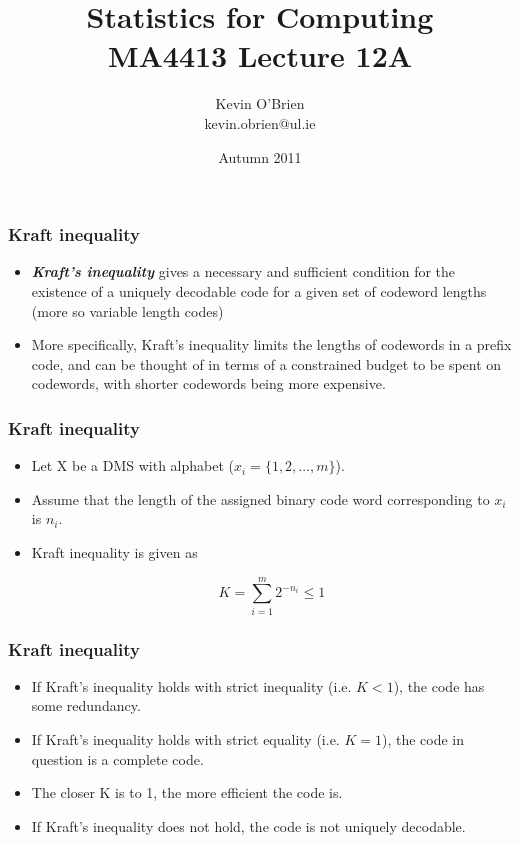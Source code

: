 \documentclass[a4]{beamer}
\title[MA4413]{Statistics for Computing \\ {\normalsize MA4413 Lecture 12A}}
\author[Kevin O'Brien]{Kevin O'Brien \\ {\scriptsize kevin.obrien@ul.ie}}
\date{Autumn 2011}
\institute[Maths \& Stats]{Dept. of Mathematics \& Statistics, \\ University \textit{of} Limerick}
\begin{document}
	
\begin{frame}
\frametitle{Kraft inequality}
\begin{itemize}
\item \textbf{\emph{Kraft's inequality}} gives a necessary and sufficient condition for the existence of a uniquely decodable code for a given set of codeword lengths (more so variable length codes)

\item More specifically, Kraft's inequality limits the lengths of codewords in a prefix code, and can be thought of in terms of a constrained budget to be spent on codewords, with shorter codewords being more expensive.


\end{itemize}
\end{frame}
\begin{frame}
\frametitle{Kraft inequality}
\begin{itemize}
\item Let X be a DMS with alphabet ($x _i = \{1, 2, \ldots ,m\}$). \item Assume that the length of the assigned binary
code word corresponding to $x_i$ is $n_i$.
\item Kraft inequality is given as

 \[ K = \sum^{m}_{i=1}2^{-n_i} \leq 1 \]

\end{itemize}
\end{frame}
\begin{frame}
\frametitle{Kraft inequality}
\begin{itemize}
\item If Kraft's inequality holds with strict inequality (i.e. $K < 1$), the code has some redundancy.
\item If Kraft's inequality holds with strict equality (i.e. $K = 1$), the code in question is a complete code.
\item The closer K is to 1, the more efficient the code is.
\item If Kraft's inequality does not hold, the code is not uniquely decodable.
\end{itemize}
\end{frame}
\end{document}

